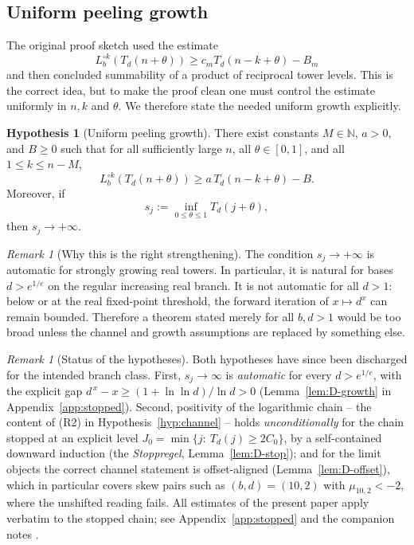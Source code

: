 \documentclass[11pt,a4paper]{article}
\theoremstyle{plain}
\theoremstyle{definition}
\newtheorem{hypothesis}[theorem]{Hypothesis}
\theoremstyle{remark}
\newtheorem{remark}[theorem]{Remark}
\newcommand{\N}{\mathbb{N}}
\begin{document}
\subsection{Uniform peeling growth}

The original proof sketch used the estimate
\[
  L_b^{\circ k}(T_d(n+\theta))\geq c_m T_d(n-k+\theta)-B_m
\]
and then concluded summability of a product of reciprocal tower levels.  This is the correct idea, but to make the proof clean one must control the estimate uniformly in $n,k$ and $\theta$.  We therefore state the needed uniform growth explicitly.

\begin{hypothesis}[Uniform peeling growth]\label{hyp:peeling-growth}
There exist constants $M\in\N$, $a>0$, and $B\geq0$ such that for all sufficiently large $n$, all $\theta\in[0,1]$, and all $1\leq k\leq n-M$,
\begin{equation}\label{eq:uniform-peeling-growth}
  L_b^{\circ k}(T_d(n+\theta))\geq a\,T_d(n-k+\theta)-B.
\end{equation}
Moreover, if
\begin{equation}\label{eq:sj-def}
  s_j:=\inf_{0\leq\theta\leq1}T_d(j+\theta),
\end{equation}
then $s_j\to+\infty$.
\end{hypothesis}

\begin{remark}[Why this is the right strengthening]\label{rem:threshold}
The condition $s_j\to+\infty$ is automatic for strongly growing real towers.  In particular, it is natural for bases $d>e^{1/e}$ on the regular increasing real branch.  It is not automatic for all $d>1$: below or at the real fixed-point threshold, the forward iteration of $x\mapsto d^x$ can remain bounded.  Therefore a theorem stated merely for all $b,d>1$ would be too broad unless the channel and growth assumptions are replaced by something else.
\end{remark}

\begin{remark}[Status of the hypotheses]\label{rem:hyp-status}
Both hypotheses have since been discharged for the intended branch class.
First, $s_j\to\infty$ is \emph{automatic} for every $d>e^{1/e}$, with the
explicit gap $d^{\,x}-x\ge(1+\ln\ln d)/\ln d>0$ (Lemma~\ref{lem:D-growth} in
Appendix~\ref{app:stopped}).  Second, positivity of the logarithmic chain --
the content of (R2) in Hypothesis~\ref{hyp:channel} -- holds
\emph{unconditionally} for the chain stopped at an explicit level
$J_0=\min\{j:\ T_d(j)\ge 2C_0\}$, by a self-contained downward induction
(the \emph{Stoppregel}, Lemma~\ref{lem:D-stop}); and for the limit objects
the correct channel statement is offset-aligned
(Lemma~\ref{lem:D-offset}), which in particular covers skew pairs such as
$(b,d)=(10,2)$ with $\mu_{10,2}<-2$, where the unshifted reading fails.
All estimates of the present paper apply verbatim to the stopped chain; see
Appendix~\ref{app:stopped} and the companion notes
\cite{justus-diffeo-note,justus-stoppregel-note}.
\end{remark}
\end{document}
